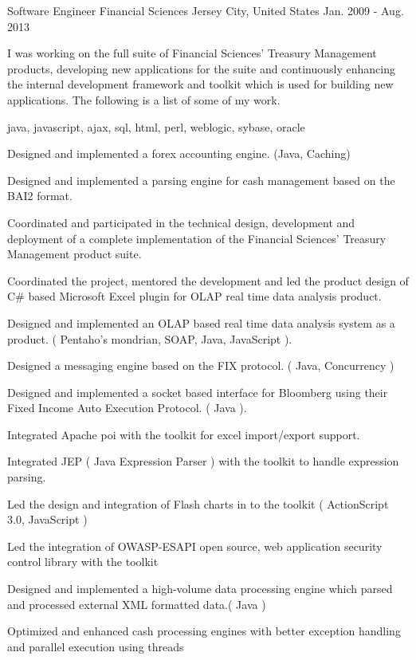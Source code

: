 \cventry
    {Software Engineer} %
    {Financial Sciences} %
    {Jersey City, United States} %
    {Jan. 2009 - Aug. 2013} %
    {
    \begin{cvitems} %
        I was working on the full suite of Financial Sciences' Treasury Management products, developing new applications for the suite and continuously enhancing the
        internal development framework and toolkit which is used for building new applications. The following is a list of some of my work.
        \item { java, javascript, ajax, sql, html, perl, weblogic, sybase, oracle }
        \item { Designed and implemented a forex accounting engine. (Java, Caching)}
        \item { Designed and implemented a parsing engine for cash management based on the BAI2 format.}
        \item { Coordinated and participated in the technical design, development and deployment of a complete implementation of the Financial Sciences' Treasury Management product suite.}
        \item { Coordinated the project, mentored the development and led the product design of C\# based Microsoft Excel plugin for OLAP real time data analysis product.}
        \item { Designed and implemented an OLAP based real time data analysis system as a product. ( Pentaho's mondrian, SOAP, Java, JavaScript ).}
        \item { Designed a messaging engine based on the FIX protocol. ( Java, Concurrency )}
        \item { Designed and implemented a socket based interface for Bloomberg using their Fixed Income Auto Execution Protocol. ( Java ).}
        \item { Integrated Apache poi with the toolkit for excel import/export support.}
        \item { Integrated JEP ( Java Expression Parser ) with the toolkit to handle expression parsing.}
        \item { Led the design and integration of Flash charts in to the toolkit ( ActionScript 3.0, JavaScript )}
        \item { Led the integration of OWASP-ESAPI open source, web application security control library with the toolkit}
        \item { Designed and implemented a high-volume data processing engine which parsed and processed external XML formatted data.( Java )}
        \item { Optimized and enhanced cash processing engines with better exception handling and parallel execution using threads }
    \end{cvitems}
    }